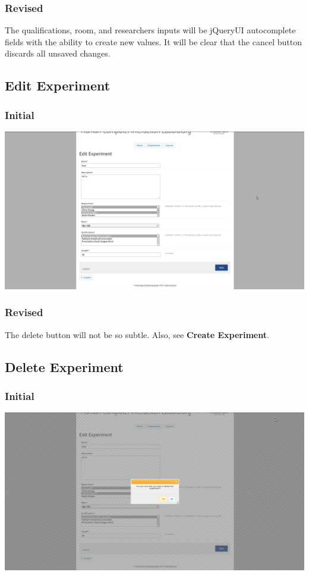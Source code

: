 \subsubsection{Revised}
The qualifications, room, and researchers inputs will be jQueryUI autocomplete fields with the ability to create new values. It will be clear that the cancel button discards all unsaved changes.

\subsection{Edit Experiment}
\subsubsection{Initial}
\includegraphics[width=6in]{../other/initial-interface-design/edit-experiment.png}
\subsubsection{Revised}
The delete button will not be so subtle. Also, see {\bf Create Experiment}.

\subsection{Delete Experiment}
\subsubsection{Initial}
\includegraphics[width=6in]{../other/initial-interface-design/delete-experiment.png}

